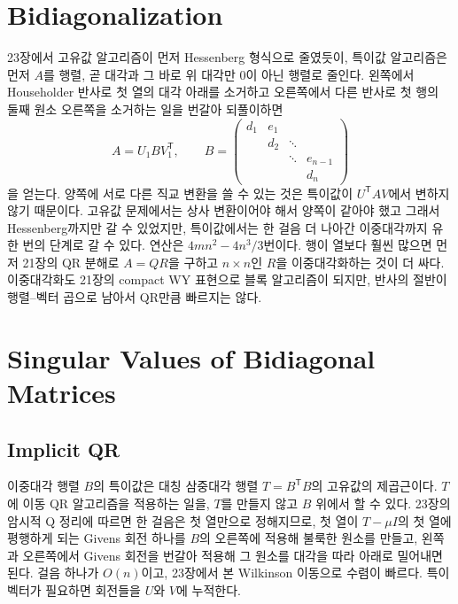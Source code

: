 \section{Bidiagonalization}
\label{sec:bidiagonalization}

23장에서 고유값 알고리즘이 먼저 Hessenberg 형식으로 줄였듯이, 특이값 알고리즘은 먼저 $A$를  행렬, 곧 대각과 그 바로 위 대각만 $0$이 아닌 행렬로 줄인다. 왼쪽에서 Householder 반사로 첫 열의 대각 아래를 소거하고 오른쪽에서 다른 반사로 첫 행의 둘째 원소 오른쪽을 소거하는 일을 번갈아 되풀이하면
\[
A=U_1BV_1^{\mathsf T},\qquad B=\begin{pmatrix}d_1&e_1&&\\&d_2&\ddots&\\&&\ddots&e_{n-1}\\&&&d_n\end{pmatrix}
\]
을 얻는다\cite{golub1965kahan}. 양쪽에 서로 다른 직교 변환을 쓸 수 있는 것은 특이값이 $U^{\mathsf T}AV$에서 변하지 않기 때문이다. 고유값 문제에서는 상사 변환이어야 해서 양쪽이 같아야 했고 그래서 Hessenberg까지만 갈 수 있었지만, 특이값에서는 한 걸음 더 나아간 이중대각까지 유한 번의 단계로 갈 수 있다. 연산은 $4mn^2-4n^3/3$번이다. 행이 열보다 훨씬 많으면 먼저 21장의 QR 분해로 $A=QR$을 구하고 $n\times n$인 $R$을 이중대각화하는 것이 더 싸다. 이중대각화도 21장의 compact WY 표현으로 블록 알고리즘이 되지만, 반사의 절반이 행렬--벡터 곱으로 남아서 QR만큼 빠르지는 않다.

\section{Singular Values of Bidiagonal Matrices}
\label{sec:bidiagonal-svd}

\subsection{Implicit QR}

이중대각 행렬 $B$의 특이값은 대칭 삼중대각 행렬 $T=B^{\mathsf T}B$의 고유값의 제곱근이다. $T$에 이동 QR 알고리즘을 적용하는 일을, $T$를 만들지 않고 $B$ 위에서 할 수 있다. 23장의 암시적 Q 정리에 따르면 한 걸음은 첫 열만으로 정해지므로, 첫 열이 $T-\mu I$의 첫 열에 평행하게 되는 Givens 회전 하나를 $B$의 오른쪽에 적용해 불룩한 원소를 만들고, 왼쪽과 오른쪽에서 Givens 회전을 번갈아 적용해 그 원소를 대각을 따라 아래로 밀어내면 된다\cite{golub1970reinsch}. 걸음 하나가 $O(n)$이고, 23장에서 본 Wilkinson 이동으로 수렴이 빠르다. 특이벡터가 필요하면 회전들을 $U$와 $V$에 누적한다.

